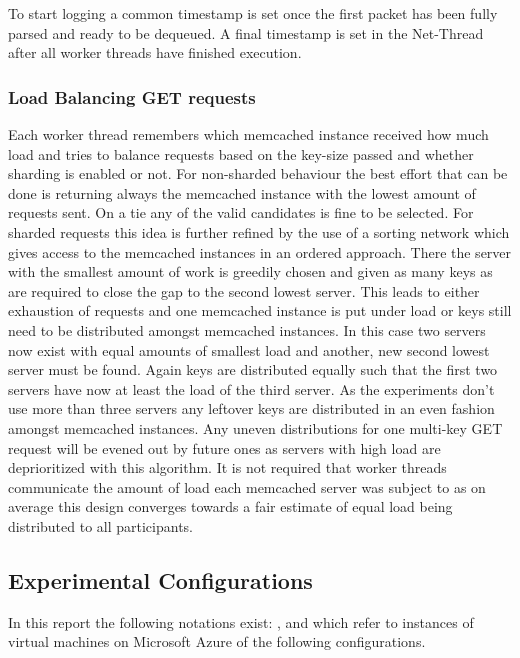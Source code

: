         To start logging a common timestamp is set once the first packet has been fully parsed and ready to be dequeued.
        A final timestamp is set in the Net-Thread after all worker threads have finished execution.

    \subsubsection{Load Balancing GET requests}
        Each worker thread remembers which memcached instance received how much load and tries to balance requests based
        on the key-size passed and whether sharding is enabled or not.  For non-sharded behaviour the best effort that
        can be done is returning always the memcached instance with the lowest amount of requests sent. On a tie any of
        the valid candidates is fine to be selected. For sharded requests this idea is further refined by the use of a
        sorting network which gives access to the memcached instances in an ordered approach. There the server with the
        smallest amount of work is greedily chosen and given as many keys as are required to close the gap to the second
        lowest server. This leads to either exhaustion of requests and one memcached instance is put under load or keys
        still need to be distributed amongst memcached instances. In this case two servers now exist with equal amounts
        of smallest load and another, new second lowest server must be found. Again keys are distributed equally such
        that the first two servers have now at least the load of the third server. As the experiments don't use more
        than three servers any leftover keys are distributed in an even fashion amongst memcached instances. Any uneven
        distributions for one multi-key GET request will be evened out by future ones as servers with high load are
        deprioritized with this algorithm. It is not required that worker threads communicate the amount of load each
        memcached server was subject to as on average this design converges towards a fair estimate of equal load being
        distributed to all participants.


    \subsection{Experimental Configurations\label{subsec:1_exp-conf}}
        In this report the following notations exist: \cli, \mw{} and \srv{} which refer
        to instances of virtual machines on Microsoft Azure of the following configurations.

